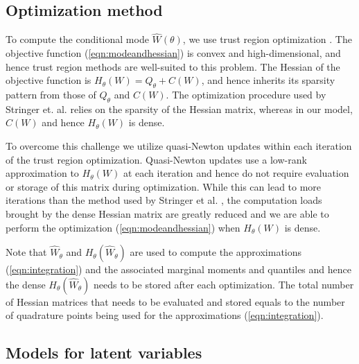 \documentclass[AMA,STIX1COL,doublespace]{WileyNJD-v2}
\begin{document}
\subsection{Optimization method}\label{subsec:opt}

To compute the conditional mode $\hat{W}(\theta)$, we use trust region optimization \cite{trustoptim}. The objective function (\ref{eqn:modeandhessian}) is convex and high-dimensional, and hence trust region methods are well-suited to this problem. The Hessian of the objective function is $H_{\theta}(W) = Q_{\theta} + C(W)$, and hence inherits its sparsity pattern from those of $Q_{\theta}$ and $C(W)$. The optimization procedure used by Stringer et. al. \cite{casecross} relies on the sparsity of the Hessian matrix, whereas in our model, $C(W)$ and hence $H_{\theta}(W)$ is dense. 

To overcome this challenge we utilize quasi-Newton updates within each iteration of the trust region optimization. Quasi-Newton updates use a low-rank approximation to $H_{\theta}(W)$ at each iteration and hence do not require evaluation or storage of this matrix during optimization. While this can lead to more iterations than the method used by Stringer et al. \cite{casecross}, the computation loads brought by the dense Hessian matrix are greatly reduced and we are able to perform the optimization (\ref{eqn:modeandhessian}) when $H_{\theta}(W)$ is dense. 

Note that $\widehat{W}_{\theta}$ and $H_{\theta}(\widehat{W}_{\theta})$ are used to compute the approximations (\ref{eqn:integration}) and the associated marginal moments and quantiles and hence the dense $H_{\theta}(\widehat{W}_{\theta})$ needs to be stored after each optimization. The total number of Hessian matrices that needs to be evaluated and stored equals to the number of quadrature points being used for the approximations (\ref{eqn:integration}).


\subsection{Models for latent variables}\label{subsec:latent}
\end{document}
